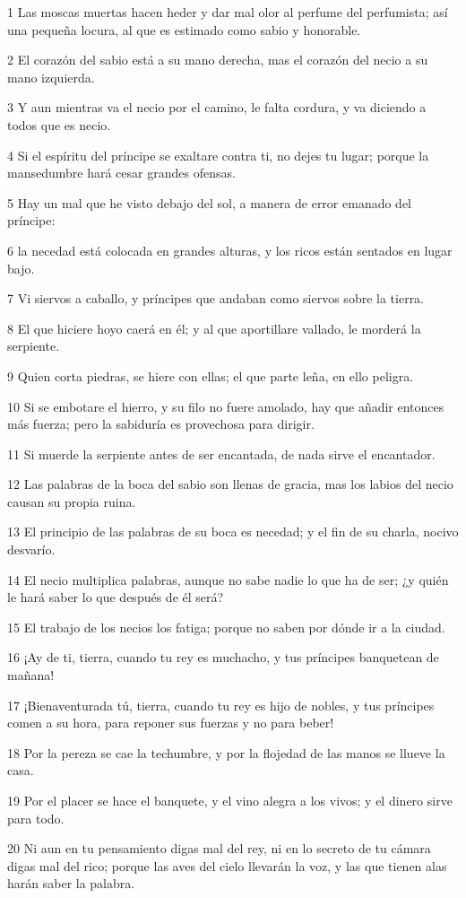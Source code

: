 \par 1 Las moscas muertas hacen heder y dar mal olor al perfume del perfumista; así una pequeña locura, al que es estimado como sabio y honorable.
\par 2 El corazón del sabio está a su mano derecha, mas el corazón del necio a su mano izquierda.
\par 3 Y aun mientras va el necio por el camino, le falta cordura, y va diciendo a todos que es necio.
\par 4 Si el espíritu del príncipe se exaltare contra ti, no dejes tu lugar; porque la mansedumbre hará cesar grandes ofensas.
\par 5 Hay un mal que he visto debajo del sol, a manera de error emanado del príncipe:
\par 6 la necedad está colocada en grandes alturas, y los ricos están sentados en lugar bajo.
\par 7 Vi siervos a caballo, y príncipes que andaban como siervos sobre la tierra.
\par 8 El que hiciere hoyo caerá en él; y al que aportillare vallado, le morderá la serpiente.
\par 9 Quien corta piedras, se hiere con ellas; el que parte leña, en ello peligra.
\par 10 Si se embotare el hierro, y su filo no fuere amolado, hay que añadir entonces más fuerza; pero la sabiduría es provechosa para dirigir.
\par 11 Si muerde la serpiente antes de ser encantada, de nada sirve el encantador.
\par 12 Las palabras de la boca del sabio son llenas de gracia, mas los labios del necio causan su propia ruina.
\par 13 El principio de las palabras de su boca es necedad; y el fin de su charla, nocivo desvarío. 
\par 14 El necio multiplica palabras, aunque no sabe nadie lo que ha de ser; ¿y quién le hará saber lo que después de él será?
\par 15 El trabajo de los necios los fatiga; porque no saben por dónde ir a la ciudad.
\par 16 ¡Ay de ti, tierra, cuando tu rey es muchacho, y tus príncipes banquetean de mañana!
\par 17 ¡Bienaventurada tú, tierra, cuando tu rey es hijo de nobles, y tus príncipes comen a su hora, para reponer sus fuerzas y no para beber!
\par 18 Por la pereza se cae la techumbre, y por la flojedad de las manos se llueve la casa.
\par 19 Por el placer se hace el banquete, y el vino alegra a los vivos; y el dinero sirve para todo.
\par 20 Ni aun en tu pensamiento digas mal del rey, ni en lo secreto de tu cámara digas mal del rico; porque las aves del cielo llevarán la voz, y las que tienen alas harán saber la palabra.

